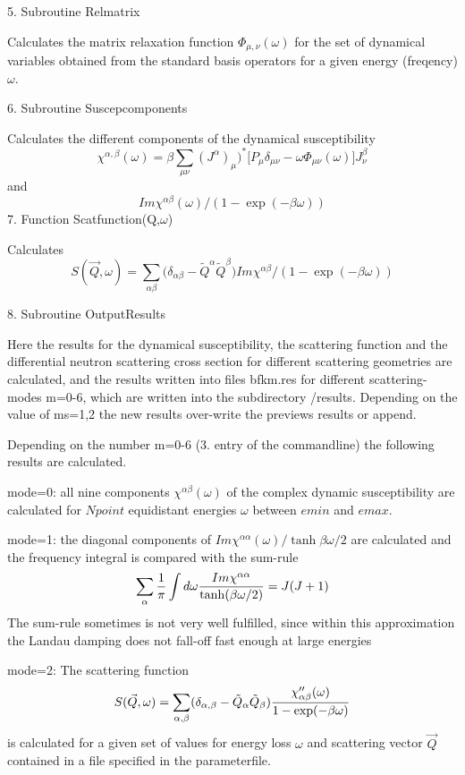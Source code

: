 5. Subroutine Relmatrix

Calculates the matrix relaxation function $\Phi_{\mu,\nu}(\omega)$ for the set 
of dynamical variables
obtained from  the standard basis operators for a given energy (freqency)
$\omega$.

6. Subroutine Suscepcomponents 

Calculates the different components of the
dynamical susceptibility
$$
\chi^{\alpha,\beta}(\omega) = \beta\sum_{\mu \nu}(J^\alpha)_\mu)^*
\bigl[P_\mu\delta_{\mu\nu}-\omega \Phi_{\mu\nu}(\omega)\bigr]J^\beta_\nu
$$ 
and 
$$
Im \chi^{\alpha\beta}(\omega)/(1-\exp(-\beta\omega))
$$
7. Function Scatfunction(Q,$\omega$)

Calculates
$$
S(\vec Q,\omega)= \sum_{\alpha\beta}\bigl(\delta_{\alpha\beta} - \tilde
Q^\alpha\tilde Q^\beta\bigr) Im \chi^{\alpha\beta}/(1-\exp(-\beta\omega))
$$


8. Subroutine OutputResults 

Here the results for the dynamical susceptibility, the scattering function
and the differential neutron scattering cross section for different
scattering geometries are calculated, and the results written into files 
bfkm.res for different scattering-modes m=0-6, which are written into the  
subdirectory /results. Depending on the value of ms=1,2 the new results
over-write the previews results or append.  

Depending on the number m=0-6 (3. entry of the commandline) the following
results are calculated. 

mode=0: all nine components $\chi^{\alpha\beta}(\omega)$  of the complex 
dynamic susceptibility are calculated for $Npoint$ equidistant energies  $\omega$ 
between $emin$ and $emax$. 

mode=1: the diagonal components of $Im \chi^{\alpha\alpha}(\omega)/\tanh{\beta\omega/2}$
are calculated and the frequency integral is compared with the sum-rule 
$$
\sum_\alpha {1\over\pi}\int d\omega {Im
\chi^{\alpha\alpha}\over \tanh(\beta\omega/2)} 
= J(J+1) 
$$
The sum-rule sometimes is not very well fulfilled, since within this
approximation the Landau damping does not fall-off fast enough at large
energies

mode=2: The scattering function 
$$
S(\vec Q,\omega)=\sum_{\alpha,\beta} (\delta_{\alpha, \beta}- \tilde Q_\alpha \tilde
Q_\beta){ \chi''_{\alpha \beta}(\omega)\over 1-\exp(-\beta\omega)}
$$ 
is calculated for a given set of values for  
energy loss $\omega$ and scattering vector $\vec Q$ contained in a file
specified in the parameterfile. 

